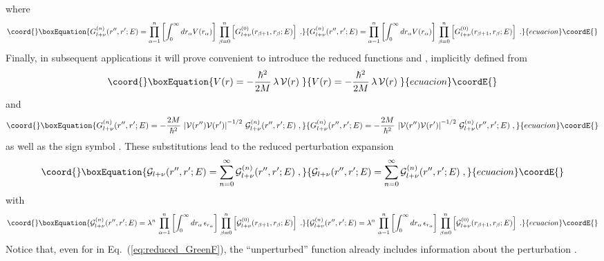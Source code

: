 \documentclass[a4paper,preprint,draft,showpacs,amsmath,amsfonts,amssymb,aps,prd]{revtex4}%
\begin{document}
where
\begin{equation}\coord{}\boxEquation{
G^{(n)}_{l+\nu} (r'',r';E) 
=
\prod_{\alpha=1}^{n} 
\left[ \int_{0}^{\infty}
d r_{\alpha} 
 V(r_{\alpha})  \right]
\,
\prod_{\beta=0}^{n} \left[ 
G^{(0)}_{l+\nu} (r_{\beta +1},r_{\beta};E) 
  \right]
\;  .
\label{eq:GreenF_perturb_expansion_radial_nth_order}
}{
G^{(n)}_{l+\nu} (r'',r';E) 
=
\prod_{\alpha=1}^{n} 
\left[ \int_{0}^{\infty}
d r_{\alpha} 
 V(r_{\alpha})  \right]
\,
\prod_{\beta=0}^{n} \left[ 
G^{(0)}_{l+\nu} (r_{\beta +1},r_{\beta};E) 
  \right]
\;  .
}{ecuacion}\coordE{}\end{equation}
Finally, in subsequent applications it will prove convenient to introduce the reduced
functions \coordHE{}
 and \coordHE{},
implicitly defined from
\begin{equation}\coord{}\boxEquation{
V ( r ) = - \frac{\hbar^{2}}{2M}\, \lambda \,
{\mathcal V} (r)
\;  
\label{eq:reduced_potential}
}{
V ( r ) = - \frac{\hbar^{2}}{2M}\, \lambda \,
{\mathcal V} (r)
\;  
}{ecuacion}\coordE{}\end{equation}
and
\begin{equation}\coord{}\boxEquation{
G^{(n)}_{l+\nu} (r'',r';E)    
 = 
 -
\frac{2M}{\hbar^{2}} 
\,
\left| 
{\mathcal V} (r'')
{\mathcal V} (r')
\right|^{-1/2}
\,
{\mathcal G}^{(n)}_{l+\nu} (r'',r';E)    
\;  ,
\label{eq:reduced_GreenF}
}{
G^{(n)}_{l+\nu} (r'',r';E)    
 = 
 -
\frac{2M}{\hbar^{2}} 
\,
\left| 
{\mathcal V} (r'')
{\mathcal V} (r')
\right|^{-1/2}
\,
{\mathcal G}^{(n)}_{l+\nu} (r'',r';E)    
\;  ,
}{ecuacion}\coordE{}\end{equation}
as well as the sign
symbol
\coordHE{}.
These substitutions
lead to the reduced perturbation expansion
\begin{equation}\coord{}\boxEquation{
{\mathcal G}_{l+\nu} (r'',r';E) =
\sum_{n=0}^{\infty}
{\mathcal G}^{(n)}_{l+\nu} (r'',r';E) 
\; ,
\label{eq:reduced_GreenF_perturb_expansion_radial}
}{
{\mathcal G}_{l+\nu} (r'',r';E) =
\sum_{n=0}^{\infty}
{\mathcal G}^{(n)}_{l+\nu} (r'',r';E) 
\; ,
}{ecuacion}\coordE{}\end{equation}
with
\begin{equation}\coord{}\boxEquation{
{\mathcal G}^{(n)}_{l+\nu} (r'',r';E) 
=
\lambda^{n}
\,
\prod_{\alpha=1}^{n} 
\left[ 
\int_{0}^{\infty}
d r_{\alpha}  \,  \epsilon_{r_{\alpha}}
\right]
\,
\prod_{\beta=0}^{n} \left[ 
{\mathcal G}^{(0)}_{l+\nu} (r_{\beta +1},r_{\beta};E) 
  \right]
\;  .
\label{eq:reduced_GreenF_perturb_expansion_radial_nth_order}
}{
{\mathcal G}^{(n)}_{l+\nu} (r'',r';E) 
=
\lambda^{n}
\,
\prod_{\alpha=1}^{n} 
\left[ 
\int_{0}^{\infty}
d r_{\alpha}  \,  \epsilon_{r_{\alpha}}
\right]
\,
\prod_{\beta=0}^{n} \left[ 
{\mathcal G}^{(0)}_{l+\nu} (r_{\beta +1},r_{\beta};E) 
  \right]
\;  .
}{ecuacion}\coordE{}\end{equation}
Notice that, even for \coordHE{} in Eq.~(\ref{eq:reduced_GreenF}),
the ``unperturbed'' function
\coordHE{} 
already includes information about the perturbation
\coordHE{}. 
\end{document}
